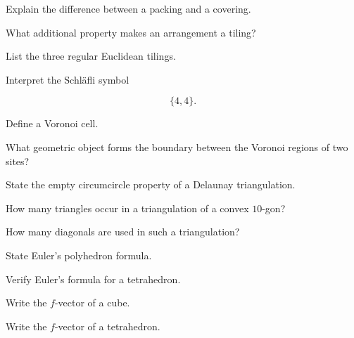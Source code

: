 \begin{exercise}[1]
Explain the difference between a packing and a covering.
\end{exercise}

\begin{exercise}[1]
What additional property makes an arrangement a tiling?
\end{exercise}

\begin{exercise}[1]
List the three regular Euclidean tilings.
\end{exercise}

\begin{exercise}[1]
Interpret the Schl\"afli symbol

\[
\{4,4\}.
\]
\end{exercise}

\begin{exercise}[1]
Define a Voronoi cell.
\end{exercise}

\begin{exercise}[1]
What geometric object forms the boundary between the Voronoi regions of two
sites?
\end{exercise}

\begin{exercise}[1]
State the empty circumcircle property of a Delaunay triangulation.
\end{exercise}

\begin{exercise}[1]
How many triangles occur in a triangulation of a convex \(10\)-gon?
\end{exercise}

\begin{exercise}[1]
How many diagonals are used in such a triangulation?
\end{exercise}

\begin{exercise}[1]
State Euler's polyhedron formula.
\end{exercise}

\begin{exercise}[1]
Verify Euler's formula for a tetrahedron.
\end{exercise}

\begin{exercise}[1]
Write the \(f\)-vector of a cube.
\end{exercise}

\begin{exercise}[1]
Write the \(f\)-vector of a tetrahedron.
\end{exercise}

